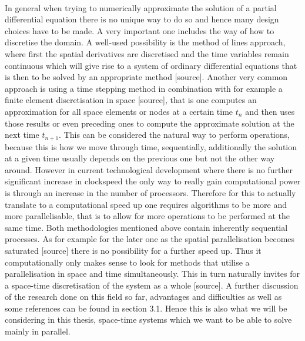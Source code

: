 \documentclass[../draft_1.tex]{subfiles}
\begin{document}
\smallskip
\\
In general when trying to numerically approximate the solution of a partial differential equation there is no unique way to do so and hence many design choices have to be made. A very important one includes the way of how to discretise the domain. A well-used possibility is the method of lines approach, where first the spatial derivatives are discretised and the time variables remain continuous which will give rise to a system of ordinary differential equations that is then to be solved by an appropriate method [source]. Another very common approach is using a time stepping method in combination with for example a finite element discretisation in space [source], that is one computes an approximation for all space elements or nodes at a certain time $t_n$ and then uses those results or even preceding ones to compute the approximate solution at the next time $t_{n+1}$. This can be considered the natural way to perform operations, because this is how we move through time, sequentially, additionally the solution at a given time usually depends on the previous one but not the other way around. 
However in current technological development where there is no further significant increase in clockspeed the only way to really gain computational power is through an increase in the number of processors. Therefore for this to actually translate to a computational speed up one requires algorithms to be more and more parallelisable, that is to allow for more operations to be performed at the same time. Both methodologies mentioned above contain inherently sequential processes. As for example for the later one as the spatial parallelisation becomes saturated [source] there is no possibility for a further speed up. Thus it computationally only makes sense to look for methods that utilise a parallelisation in space and time simultaneously. This in turn naturally invites for a space-time discretisation of the system as a whole [source]. A further discussion of the research done on this field so far, advantages and difficulties as well as some references can be found in section 3.1. Hence this is also what we will be considering in this thesis, space-time systems which we want to be able to solve mainly in parallel. 
\smallskip
\\
\end{document}

